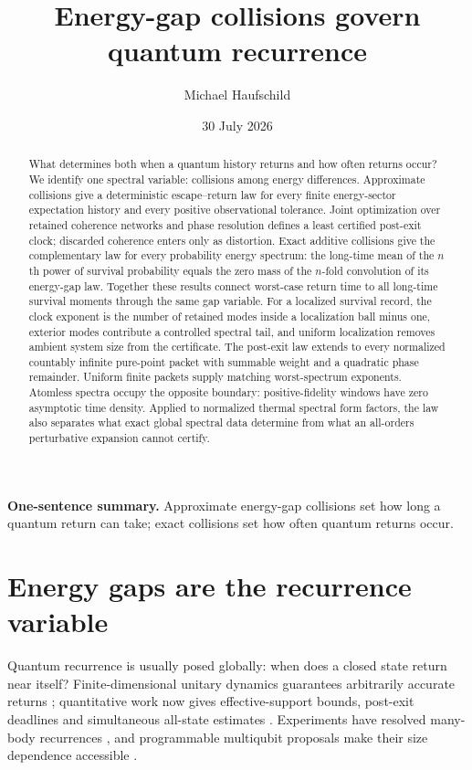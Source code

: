 \documentclass[10pt]{article}
\title{\textbf{Energy-gap collisions govern quantum recurrence}}
\author{Michael Haufschild}
\date{30 July 2026}
\theoremstyle{definition}
\begin{document}
\maketitle

\begin{abstract}
What determines both when a quantum history returns and how often returns
occur? We identify one spectral variable: collisions among energy
differences. Approximate collisions give a deterministic escape--return law
for every finite energy-sector expectation history and every positive
observational tolerance. Joint optimization over retained coherence
networks and phase resolution defines a least certified post-exit clock;
discarded coherence enters only as distortion. Exact additive collisions
give the complementary law for every probability energy spectrum:
the long-time mean of the \(n\)th power of survival probability equals the
zero mass of the \(n\)-fold convolution of its energy-gap law. Together
these results connect worst-case return time to all long-time survival
moments through the same gap variable. For a localized survival record,
the clock exponent is the number of retained modes inside a localization
ball minus one, exterior modes contribute a controlled spectral tail, and
uniform localization removes ambient system size from the certificate.
The post-exit law extends to every normalized countably infinite pure-point
packet with summable weight and a quadratic phase remainder. Uniform finite
packets supply matching worst-spectrum exponents. Atomless spectra occupy
the opposite boundary: positive-fidelity windows have zero asymptotic time
density. Applied to normalized thermal spectral form factors, the law also
separates what exact global spectral data determine from what an all-orders
perturbative expansion cannot certify.
\end{abstract}

\noindent\textbf{One-sentence summary.}
Approximate energy-gap collisions set how long a quantum return can take;
exact collisions set how often quantum returns occur.

\section*{Energy gaps are the recurrence variable}

Quantum recurrence is usually posed globally: when does a closed state
return near itself? Finite-dimensional unitary dynamics guarantees
arbitrarily accurate returns \cite{BocchieriLoinger1957}; quantitative work
now gives effective-support bounds, post-exit deadlines and simultaneous
all-state estimates \cite{CamposVenuti2015,KotowskiOszmaniec2026,
GuptaShort2026}. Experiments have resolved many-body recurrences
\cite{RauerEtAl2018}, and programmable multiqubit proposals make their
size dependence accessible \cite{KarimiEtAl2026}.
\end{document}
